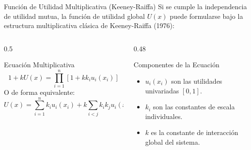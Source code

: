 \documentclass[aspectratio=169, 10pt]{beamer}
\begin{document}
\begin{frame}{Función de Utilidad Multiplicativa (Keeney-Raiffa)}
    Si se cumple la independencia de utilidad mutua, la función de utilidad global $U(x)$ puede formularse bajo la estructura multiplicativa clásica de Keeney-Raiffa (1976):
    \begin{columns}
        \begin{column}{0.5\textwidth}
            \begin{block}{Ecuación Multiplicativa}
                \begin{equation*}
                    1 + k U(x) = \prod_{i=1}^n [1 + k k_i u_i(x_i)]
                \end{equation*}
                O de forma equivalente:
                \begin{equation*}
                    U(x) = \sum_{i=1}^n k_i u_i(x_i) + k \sum_{i < j} k_i k_j u_i(x_i) u_j(x_j) + \dots
                \end{equation*}
            \end{block}
        \end{column}
        
        \begin{column}{0.48\textwidth}
            \begin{exampleblock}{Componentes de la Ecuación}
                \begin{itemize}
                    \item $u_i(x_i)$ son las utilidades univariadas $[0, 1]$.
                    \item $k_i$ son las constantes de escala individuales.
                    \item $k$ es la constante de interacción global del sistema.
                \end{itemize}
            \end{exampleblock}
        \end{column}
    \end{columns}
\end{frame}
\end{document}
